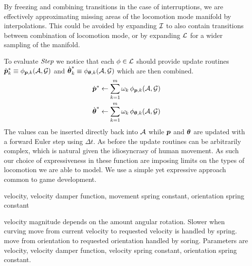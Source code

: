 By freezing and combining transitions in the case of interruptions, we are effectively approximating missing areas of the locomotion mode manifold by interpolations. This could be avoided by expanding $\mathcal{I}$ to also contain transitions between combination of locomotion mode, or by expanding $\mathcal{L}$ for a wider sampling of the manifold.

To evaluate $\textit{Step}$ we notice that each $\phi\in\mathcal{L}$ should provide update routines $\dot{\boldsymbol{p }}_k^* \equiv \phi_{\boldsymbol{p },k}(\mathcal{A},\mathcal{G})$ and $\dot{\boldsymbol{\theta }}_k^* \equiv \phi_{\boldsymbol{\theta }, k}(\mathcal{A},\mathcal{G})$ which are then combined.
\begin{subequations}
\begin{align}
\dot{\boldsymbol{p }}^*&\leftarrow \sum_{k=1}^{m}\omega_k \,\phi_{\boldsymbol{p },k}(\mathcal{A},\mathcal{G})\\
\dot{\boldsymbol{\theta }}^*&\leftarrow \sum_{k=1}^{m}\omega_k \,\phi_{\boldsymbol{\theta },k}(\mathcal{A},\mathcal{G})
\end{align}
\end{subequations}
The values can be inserted directly back into $\mathcal{A}$ while $\boldsymbol{p }$ and $\boldsymbol{\theta }$ are updated with a forward Euler step  using $\Delta{t}$. As before the update routines can be arbitrarily complex, which is natural given the idiosyncrasy of human movement. As such our choice of expressiveness in these function are imposing limits on the types of locomotion we are able to model. We use a simple yet expressive approach common to game development.   

velocity, velocity damper function, movement spring constant, orientation spring constant

velocity magnitude depends on the amount angular rotation. Slower when curving
move from current velocity to requested velocity is handled by spring.
move from orientation to requested orientation handled by soring.
Parameters are velocity, velocity damper function, velocity spring constant, orientation spring constant.


